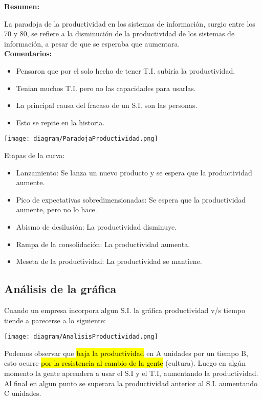 \documentclass{templateNote}
\begin{document}
\noindent
\textbf{Resumen:}

La paradoja de la productividad en los sistemas de informaci\'on, surgio entre los 70 y 80, se refiere a la disminuci\'on de la productividad de los sistemas de informaci\'on, a pesar de que se esperaba que aumentara.\\
\textbf{Comentarios:}
\begin{itemize}
    \item Pensaron que por el solo hecho de tener T.I. subir\'ia la productividad.
    \item Tenian muchos T.I. pero no las capacidades para usarlas.
    \item La principal causa del fracaso de un S.I. son las personas.
    \item Esto se repite en la historia.
\end{itemize}
\begin{center}
    \texttt{[image: diagram/ParadojaProductividad.png]}
\end{center}
Etapas de la curva:
\begin{itemize}
    \item Lanzamiento: Se lanza un nuevo producto y se espera que la productividad aumente.
    \item Pico de expectativas sobredimensionadas: Se espera que la productividad aumente, pero no lo hace.
    \item Abismo de desilusi\'on: La productividad disminuye.
    \item Rampa de la consolidaci\'on: La productividad aumenta.
    \item Meseta de la productividad: La productividad se mantiene.
\end{itemize}

\newpage
\subsection{An\'alisis de la gr\'afica}
Cuando un empresa incorpora algun S.I. la gr\'afica productividad v/s tiempo tiende a parecerse a lo siguiente:
\begin{center}
    \texttt{[image: diagram/AnalisisProductividad.png]}
\end{center}

Podemos observar que \hl{baja la productividad} en A unidades por un tiempo B, esto ocurre \hl{por la resistencia al cambio de la gente} (cultura).
Luego en alg\'un momento la gente aprendera a usar el S.I y el T.I, aumentando la productividad.
Al final en algun punto se superara la productividad anterior al S.I. aumentando C unidades.
\end{document}
